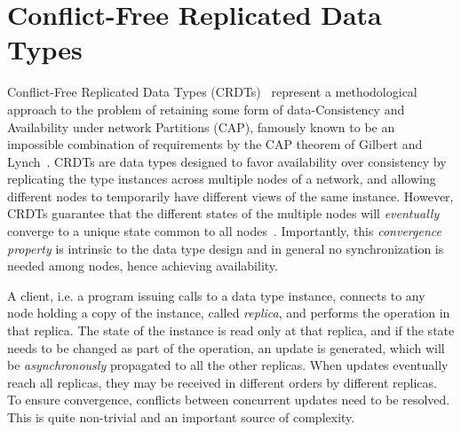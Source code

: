 

\section{Conflict-Free Replicated Data Types}

Conflict-Free Replicated Data Types (CRDTs)~\cite{DBLP:conf/sss/ShapiroPBZ11} 
represent a methodological approach to the problem of retaining
some form of data-Consistency and Availability under network Partitions (CAP),
famously known to be an impossible combination of requirements by the
CAP theorem of Gilbert and Lynch~\cite{DBLP:journals/sigact/GilbertL02}.
%
CRDTs are data types designed to favor availability over consistency
by replicating the type instances across multiple nodes of a
network, and allowing different nodes to temporarily have different
views of the same instance.
%
However, CRDTs guarantee that the different states of the multiple
nodes will \emph{eventually} converge to a unique state common to all
nodes~\cite{DBLP:conf/sss/ShapiroPBZ11,DBLP:journals/ftpl/Burckhardt14}.
%
Importantly, this \emph{convergence property} is intrinsic to the data
type design and in general no synchronization is needed among nodes,
hence achieving availability.


A client, i.e. a program issuing calls to a data type instance, connects to any node holding a copy of the instance, called \emph{replica}, and performs the operation in that replica. The state of the instance is read only at that replica, and if the state needs to be changed as part of the operation, an update is generated, which will be \emph{asynchronously} propagated to all the other replicas. When  updates eventually reach all replicas, they may be received in different orders by different replicas. To ensure convergence, conflicts between concurrent updates need to be resolved. This is quite non-trivial and an important source of complexity.

